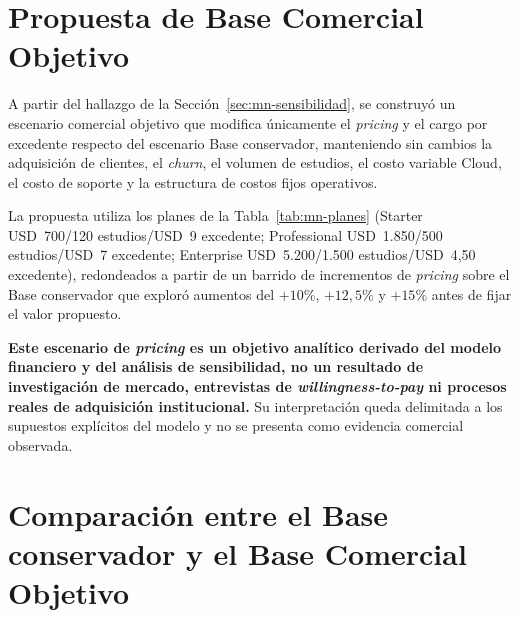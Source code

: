 \section{Propuesta de Base Comercial Objetivo}
\label{sec:mn-comercial-objetivo}

A partir del hallazgo de la Sección~\ref{sec:mn-sensibilidad}, se construyó un escenario comercial objetivo que modifica \'unicamente el \textit{pricing} y el cargo por excedente respecto del escenario Base conservador, manteniendo sin cambios la adquisición de clientes, el \textit{churn}, el volumen de estudios, el costo variable Cloud, el costo de soporte y la estructura de costos fijos operativos.

La propuesta utiliza los planes de la Tabla~\ref{tab:mn-planes} (Starter USD~700/120 estudios/USD~9 excedente; Professional USD~1.850/500 estudios/USD~7 excedente; Enterprise USD~5.200/1.500 estudios/USD~4,50 excedente), redondeados a partir de un barrido de incrementos de \textit{pricing} sobre el Base conservador que exploró aumentos del $+10\%$, $+12,5\%$ y $+15\%$ antes de fijar el valor propuesto.

\textbf{Este escenario de \textit{pricing} es un objetivo analítico derivado del modelo financiero y del análisis de sensibilidad, no un resultado de investigación de mercado, entrevistas de \textit{willingness-to-pay} ni procesos reales de adquisición institucional.} Su interpretación queda delimitada a los supuestos explícitos del modelo y no se presenta como evidencia comercial observada.

\section{Comparación entre el Base conservador y el Base Comercial Objetivo}
\label{sec:mn-comparacion}

